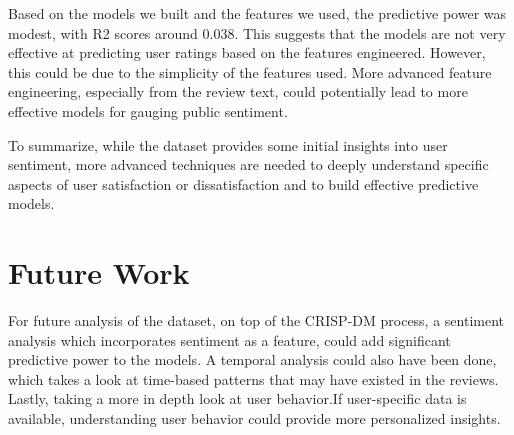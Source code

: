 \documentclass[
	a4paper, %
	10pt, %
	unnumberedsections, %
	twoside, %
]{LTJournalArticle}
\begin{document}
Based on the models we built and the features we used, the predictive power was modest, with R2 scores around 0.038. This suggests that the models are not very effective at predicting user ratings based on the features engineered. However, this could be due to the simplicity of the features used. More advanced feature engineering, especially from the review text, could potentially lead to more effective models for gauging public sentiment.

To summarize, while the dataset provides some initial insights into user sentiment, more advanced techniques are needed to deeply understand specific aspects of user satisfaction or dissatisfaction and to build effective predictive models.


\section{Future Work}

For future analysis of the dataset, on top of the CRISP-DM process, a sentiment analysis which  incorporates sentiment as a feature, could add significant predictive power to the models. A temporal analysis could also have been done, which takes a look at time-based patterns that may have existed in the reviews. Lastly, taking a more in depth look at user behavior.If user-specific data is available, understanding user behavior could provide more personalized insights.

\end{document}
